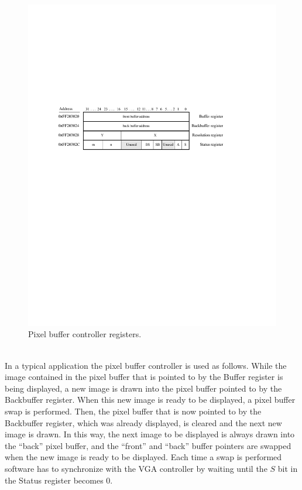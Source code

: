 \documentclass[epsfig,10pt,fullpage]{article}
\begin{document}
\begin{figure}[t]
   \begin{center}
       \includegraphics{figures/fig_DMA_ctrl.pdf}
   \end{center}
   \caption{Pixel buffer controller registers.}
	\label{fig:pixel_ctrl}
\end{figure}

~\\
\noindent
In a typical application the pixel buffer controller is used as follows. While the image
contained in the pixel buffer that is pointed to by the Buffer register is being displayed, 
a new image is drawn into the pixel buffer pointed to by the Backbuffer register. When this new
image is ready to be displayed, a pixel buffer swap is performed. Then, the pixel buffer 
that is now pointed to by the Backbuffer register, which was already displayed, is cleared and 
the next new image is drawn. In this way, the next image to be displayed is always drawn into
the ``back'' pixel buffer, and the ``front'' and ``back'' buffer pointers are swapped when 
the new image is ready to be displayed. Each time a swap is performed software has to 
synchronize with the VGA controller by waiting until the $S$ bit in the Status register becomes 0.
\end{document}
